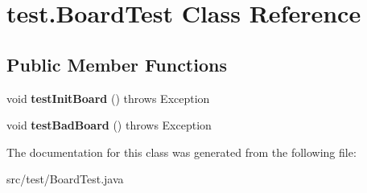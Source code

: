 \hypertarget{classtest_1_1_board_test}{}\section{test.\+Board\+Test Class Reference}
\label{classtest_1_1_board_test}
\subsection*{Public Member Functions}
\begin{DoxyCompactItemize}
\item 
\mbox{\label{classtest_1_1_board_test_a502b28a6f7870d71a737c6797a542fb9}} 
void {\bfseries test\+Init\+Board} ()  throws Exception 
\item 
\mbox{\label{classtest_1_1_board_test_a5f010eaf0964af5daaa85afcf6f23e90}} 
void {\bfseries test\+Bad\+Board} ()  throws Exception 
\end{DoxyCompactItemize}


The documentation for this class was generated from the following file\+:\begin{DoxyCompactItemize}
\item 
src/test/Board\+Test.\+java\end{DoxyCompactItemize}
